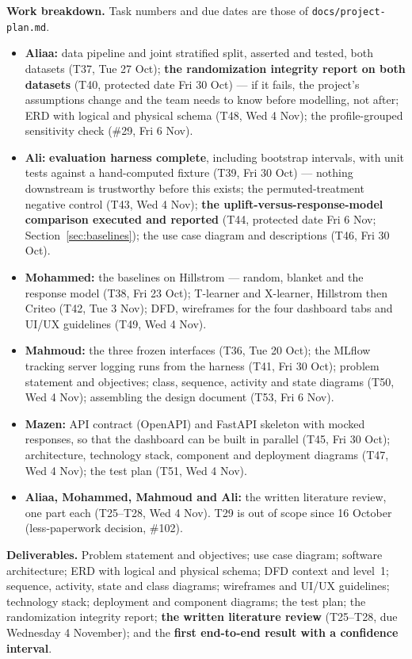 \documentclass[11pt,a4paper]{article}
\begin{document}
\textbf{Work breakdown.} Task numbers and due dates are those of \texttt{docs/project-plan.md}.
\begin{itemize}
\item \textbf{Aliaa:} data pipeline and joint stratified split, asserted and tested, both datasets
(T37, Tue 27 Oct); \textbf{the randomization integrity report on both datasets} (T40, protected
date Fri 30 Oct) --- if it fails, the project's assumptions change and the team needs to know
before modelling, not after; ERD with logical and physical schema (T48, Wed 4 Nov); the
profile-grouped sensitivity check (\#29, Fri 6 Nov).
\item \textbf{Ali:} \textbf{evaluation harness complete}, including bootstrap intervals, with unit
tests against a hand-computed fixture (T39, Fri 30 Oct) --- nothing downstream is trustworthy
before this exists; the permuted-treatment negative control (T43, Wed 4 Nov); \textbf{the
uplift-versus-response-model comparison executed and reported} (T44, protected date Fri 6 Nov;
Section~\ref{sec:baselines}); the use case diagram and descriptions (T46, Fri 30 Oct).
\item \textbf{Mohammed:} the baselines on Hillstrom --- random, blanket and the response model
(T38, Fri 23 Oct); T-learner and X-learner, Hillstrom then Criteo (T42, Tue 3 Nov); DFD, wireframes
for the four dashboard tabs and UI/UX guidelines (T49, Wed 4 Nov).
\item \textbf{Mahmoud:} the three frozen interfaces (T36, Tue 20 Oct); the MLflow tracking server
logging runs from the harness (T41, Fri 30 Oct); problem statement and objectives; class,
sequence, activity and state diagrams (T50, Wed 4 Nov); assembling the design document (T53,
Fri 6 Nov).
\item \textbf{Mazen:} API contract (OpenAPI) and FastAPI skeleton with mocked responses, so that the
dashboard can be built in parallel (T45, Fri 30 Oct); architecture, technology stack, component
and deployment diagrams (T47, Wed 4 Nov); the test plan (T51, Wed 4 Nov).
\item \textbf{Aliaa, Mohammed, Mahmoud and Ali:} the written literature review, one part each
(T25--T28, Wed 4 Nov). T29 is out of scope since 16 October (less-paperwork decision, \#102).
\end{itemize}

\textbf{Deliverables.} Problem statement and objectives; use case diagram; software architecture;
ERD with logical and physical schema; DFD context and level~1; sequence, activity, state and class
diagrams; wireframes and UI/UX guidelines; technology stack; deployment and component diagrams; the
test plan; the randomization integrity report; \textbf{the written literature review} (T25--T28,
due Wednesday 4 November); and the \textbf{first end-to-end result with a confidence interval}.
\end{document}
